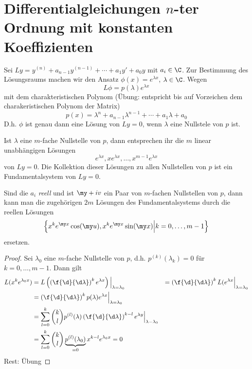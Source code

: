 \documentclass{mycourse}
\begin{document}
\section{Differentialgleichungen $n$-ter Ordnung mit konstanten Koeffizienten}


Sei $Ly = y^{(n)} + a_{n-1}y^{(n-1)}+ \dotsb + a_1y' + a_0 y$ mit $a_i \in \C$.
Zur Bestimmung des Lösungsraums machen wir den Ansatz $\phi(x) = e^{\lambda x}$, $\lambda\in \C$.
Wegen
\[
	L\phi = p(\lambda)e^{\lambda x}
\]
mit dem charakteristischen Polynom (Übung: entspricht bis auf Vorzeichen dem charakeristischen Polynom der Matrix)
\[
	p(x) = \lambda^n + a_{n-1}\lambda^{n-1} + \dotsb + a_1\lambda + a_0
\]
D.h. $\phi$ ist genau dann eine Lösung von $Ly=0$, wenn $\lambda$ eine Nullstele von $p$ ist.

\begin{st}
	\label{17.14}
	Ist $\lambda$ eine $m$-fache Nullstelle von $p$, dann entsprechen ihr die $m$ linear unabhängigen Lösungen
	\[
		e^{\lambda x}, xe^{\lambda x}, \dotsc, x^{m-1}e^{\lambda x}
	\]
	von $Ly=0$.
	Die Kollektion dieser Lösungen zu allen Nullstellen von $p$ ist ein Fundamentalsystem von $Ly=0$.

	Sind die $a_i$ \emph{reell} und ist $\my + iv$ ein Paar von $m$-fachen Nullstellen von $p$, dann kann man die zugehörigen $2m$ Lösungen des Fundamentalsystems durch die reellen Lösungen
	\[
		\left\{ x^ke^{\my x}\cos(\my u), x^k e^{\my x}\sin(\my x) \Big| k= 0,\dotsc, m-1\right\}
	\]
	ersetzen.
	\begin{proof}
		Sei $\lambda_0$ eine $m$-fache Nullstelle von $p$, d.h. $p^{(k)}(\lambda_k) = 0$ für $k=0,\dotsc,m-1$.
		Dann gilt
		\begin{align*}
			L (x^ke^{\lambda_0 x}) &= L\left( \left(\f{\d}{\d \lambda}\right)^k e^{\lambda x}\right) \Big|_{\lambda=\lambda_0}
			&= \left(\f{\d}{\d \lambda} \right)^k L(e^{\lambda x}\Big|_{\lambda = \lambda_0}\\
			&= \left(\f{\d}{\d \lambda}\right)^k p(\lambda) e^{\lambda x} \Big|_{\lambda = \lambda_0}\\
			&= \sum_{l=0}^k \binom{k}{l}p^{(l)}(\lambda) \left( \f{\d}{\d \lambda}\right)^{k-l}e^{\lambda y}\Big|_{\lambda - \lambda_0}\\
			&= \sum_{l=0}^k \binom{k}{l}\underbrace{p^{(l)}(\lambda_0)}_{=0} x^{k-l}e^{\lambda_0 x} = 0
		\end{align*}
		Rest: Übung
	\end{proof}
\end{st}
\end{document}
